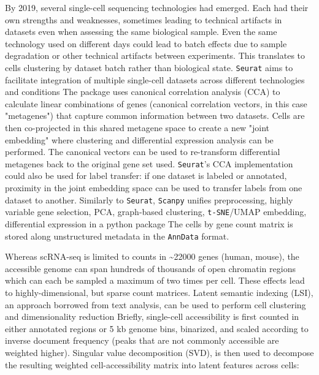 By 2019, several single-cell sequencing technologies had emerged. Each had their own strengths and weaknesses, sometimes leading to technical artifacts in datasets even when assessing the same biological sample. Even the same technology used on different days could lead to batch effects due to sample degradation or other technical artifacts between experiments. This translates to cells clustering by dataset batch rather than biological state. \verb|Seurat| aims to facilitate integration of multiple single-cell datasets across different technologies and conditions The package uses canonical correlation analysis (CCA) to calculate linear combinations of genes (canonical correlation vectors, in this case "metagenes") that capture common information between two datasets. Cells are then co-projected in this shared metagene space to create a new "joint embedding" where clustering and differential expression analysis can be performed. The canonical vectors can be used to re-transform differential metagenes back to the original gene set used. \verb|Seurat|'s CCA implementation could also be used for label transfer: if one dataset is labeled or annotated, proximity in the joint embedding space can be used to transfer labels from one dataset to another. Similarly to \verb|Seurat|, \verb|Scanpy| unifies preprocessing, highly variable gene selection, PCA, graph-based clustering, \verb|t-SNE|/UMAP embedding, differential expression in a python package The cells by gene count matrix is stored along unstructured metadata in the \verb|AnnData| format.

Whereas scRNA-seq is limited to counts in \textasciitilde{\num{22000}} genes (human, mouse), the accessible genome can span hundreds of thousands of open chromatin regions which can each be sampled a maximum of two times per cell. These effects lead to highly-dimensional, but sparse count matrices. Latent semantic indexing (LSI), an approach borrowed from text analysis, can be used to perform cell clustering and dimensionality reduction Briefly, single-cell accessibility is first counted in either annotated regions or 5 kb genome bins, binarized, and scaled according to inverse document frequency (peaks that are not commonly accessible are weighted higher). Singular value decomposition (SVD), is then used to decompose the resulting weighted cell-accessibility matrix into latent features across cells:

